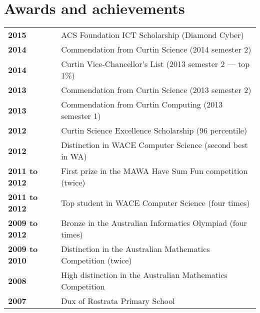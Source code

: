 \documentclass[a4paper,12pt]{article}
\begin{document}
\section*{Awards and achievements}

\begin{tabular}{p{35mm}p{125mm}}
	                    \textbf{2015}               & ACS Foundation ICT Scholarship (Diamond Cyber)
	\vspace{0.2em}  \\  \textbf{2014}               & Commendation from Curtin Science (2014 semester 2)
	\vspace{0.2em}  \\  \textbf{2014}               & Curtin Vice-Chancellor's List (2013 semester 2 --- top 1\%)
	\vspace{0.2em}  \\  \textbf{2013}               & Commendation from Curtin Science (2013 semester 2)
	\vspace{0.2em}  \\  \textbf{2013}               & Commendation from Curtin Computing (2013 semester 1)
	\vspace{0.2em}  \\  \textbf{2012}               & Curtin Science Excellence Scholarship (96 percentile)
	\vspace{0.2em}  \\  \textbf{2012}               & Distinction in WACE Computer Science (second best in WA)
	\vspace{0.2em}  \\  \textbf{2011 to 2012}       & First prize in the MAWA Have Sum Fun competition (twice)
	\vspace{0.2em}  \\  \textbf{2011 to 2012}       & Top student in WACE Computer Science (four times)
	\vspace{0.2em}  \\  \textbf{2009 to 2012}       & Bronze in the Australian Informatics Olympiad (four times)
	\vspace{0.2em}  \\  \textbf{2009 to 2010}       & Distinction in the Australian Mathematics Competition (twice)
	\vspace{0.2em}  \\  \textbf{2008}               & High distinction in the Australian Mathematics Competition
	\vspace{0.2em}  \\  \textbf{2007}               & Dux of Rostrata Primary School
\end{tabular}
\end{document}
